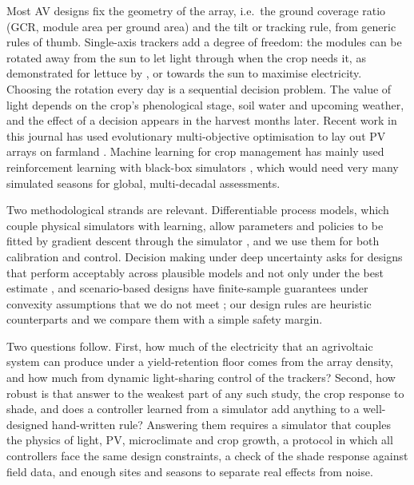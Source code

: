 Most AV designs fix the geometry of the array, i.e.\ the ground coverage ratio (GCR, module area per ground area) and the tilt or tracking rule, from generic rules of thumb. Single-axis trackers add a degree of freedom: the modules can be rotated away from the sun to let light through when the crop needs it, as demonstrated for lettuce by \citet{valle2017}, or towards the sun to maximise electricity. Choosing the rotation every day is a sequential decision problem. The value of light depends on the crop's phenological stage, soil water and upcoming weather, and the effect of a decision appears in the harvest months later. Recent work in this journal has used evolutionary multi-objective optimisation to lay out PV arrays on farmland \citep{zhang2026}. Machine learning for crop management has mainly used reinforcement learning with black-box simulators \citep{gautron2022}, which would need very many simulated seasons for global, multi-decadal assessments.

Two methodological strands are relevant. Differentiable process models, which couple physical simulators with learning, allow parameters and policies to be fitted by gradient descent through the simulator \citep{reichstein2019,shen2023}, and we use them for both calibration and control. Decision making under deep uncertainty asks for designs that perform acceptably across plausible models and not only under the best estimate \citep{marchau2019}, and scenario-based designs have finite-sample guarantees under convexity assumptions that we do not meet \citep{calafiore2006,campi2008}; our design rules are heuristic counterparts and we compare them with a simple safety margin.

Two questions follow. First, how much of the electricity that an agrivoltaic system can produce under a yield-retention floor comes from the array density, and how much from dynamic light-sharing control of the trackers? Second, how robust is that answer to the weakest part of any such study, the crop response to shade, and does a controller learned from a simulator add anything to a well-designed hand-written rule? Answering them requires a simulator that couples the physics of light, PV, microclimate and crop growth, a protocol in which all controllers face the same design constraints, a check of the shade response against field data, and enough sites and seasons to separate real effects from noise.

